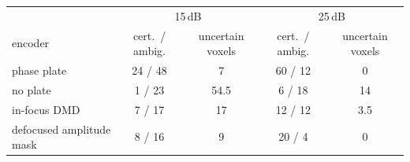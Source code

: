 \begin{tabular}{@{}l cc cc@{}}\toprule
 & \multicolumn{2}{c}{15\,dB} & \multicolumn{2}{c}{25\,dB}\\
encoder & cert.\ / ambig. & uncertain voxels & cert.\ / ambig. & uncertain voxels\\\midrule
phase plate & 24 / 48 & 7 & 60 / 12 & 0\\
no plate & 1 / 23 & 54.5 & 6 / 18 & 14\\
in-focus DMD & 7 / 17 & 17 & 12 / 12 & 3.5\\
defocused amplitude mask & 8 / 16 & 9 & 20 / 4 & 0\\
\bottomrule\end{tabular}
